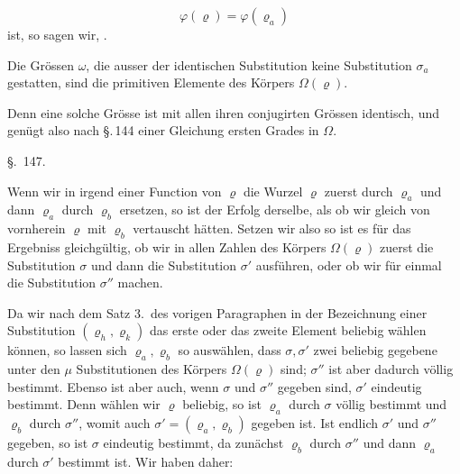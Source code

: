 
\[
\varphi(\varrho) = \varphi(\varrho_a)
\]
ist, so sagen wir, .

Die Grössen $\omega$, die ausser der identischen Substitution keine Substitution $\sigma_a$ gestatten, sind die primitiven Elemente des Körpers $\Omega(\varrho)$.


Denn eine solche Grösse ist mit allen ihren conjugirten Grössen identisch, und genügt also nach \S.\,144 einer Gleichung ersten Grades in $\Omega$.

\begin{center}
\S.\ 147.
\end{center}

\begin{center}
\end{center}

Wenn wir in irgend einer Function von $\varrho$ die Wurzel $\varrho$ zuerst durch $\varrho_a$ und dann $\varrho_a$ durch $\varrho_b$ ersetzen, so ist der Erfolg derselbe, als ob wir gleich von vornherein $\varrho$ mit $\varrho_b$ vertauscht hätten. Setzen wir also
so ist es für das Ergebniss gleichgültig, ob wir in allen Zahlen des Körpers $\Omega(\varrho)$ zuerst die Substitution $\sigma$ und dann die Substitution $\sigma'$ ausführen, oder ob wir für einmal die Substitution $\sigma''$ machen.

Da wir nach dem Satz 3.\ des vorigen Paragraphen in der Bezeichnung einer Substitution $(\varrho_h, \varrho_k)$ das erste oder das zweite Element beliebig wählen können, so lassen sich $\varrho_a, \varrho_b$ so auswählen, dass $\sigma, \sigma'$ zwei beliebig gegebene unter den $\mu$ Substitutionen des Körpers $\Omega(\varrho)$ sind; $\sigma''$ ist aber dadurch völlig bestimmt. Ebenso ist aber auch, wenn $\sigma$ und $\sigma''$ gegeben sind, $\sigma'$ eindeutig bestimmt. Denn wählen wir $\varrho$ beliebig, so ist $\varrho_a$ durch $\sigma$ völlig bestimmt und $\varrho_b$ durch $\sigma''$, womit auch $\sigma' = (\varrho_a, \varrho_b)$ gegeben ist. Ist endlich $\sigma'$ und $\sigma''$ gegeben, so ist $\sigma$ eindeutig bestimmt, da zunächst $\varrho_b$ durch $\sigma''$ und dann $\varrho_a$ durch $\sigma'$ bestimmt ist. Wir haben daher:
